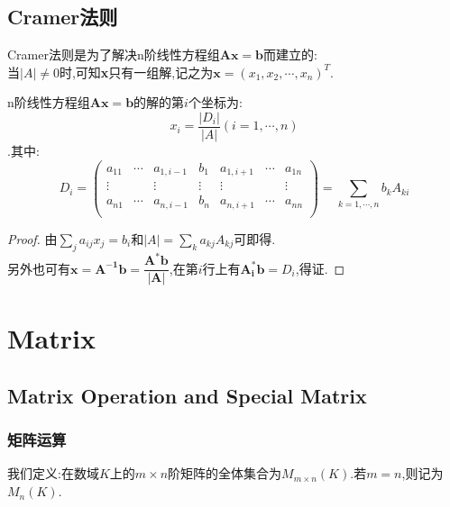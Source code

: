 \documentclass[UTF8,a4paper,notitlepage]{book}
\begin{document}
        \section{Cramer法则}
        Cramer法则是为了解决n阶线性方程组$\mathbf{Ax=b}$而建立的:\\ 
        当$|A|\neq 0$时,可知\textbf{x}只有一组解,记之为$\textbf{x}=(x_1,x_2,\cdots,x_n)^T$.
        \begin{theorem}[Cramer法则]
            n阶线性方程组$\mathbf{Ax=b}$的解的第$i$个坐标为:$$x_i=\dfrac{|D_i|}{|A|}(i=1,\cdots ,n)$$.其中:
            $$D_i=\begin{pmatrix}
                a_{11} & \cdots & a_{1,i-1} & b_1 & a_{1,i+1} & \cdots & a_{1n}\\ 
                \vdots & & \vdots & \vdots & \vdots & & \vdots \\ 
                a_{n1} & \cdots & a_{n,i-1} & b_n & a_{n,i+1} & \cdots & a_{nn}\\
            \end{pmatrix}=\sum_{k=1,\cdots ,n}b_kA_{ki}$$
        \end{theorem}
        \begin{proof}
            由$\sum_ja_{ij}x_{j}=b_i$和$|A|=\sum_k a_{kj}A_{kj}$可即得.\\ 
            另外也可有$\mathbf{x=A^{-1}b=\dfrac{A^* b}{|A|}}$,在第$i$行上有$\mathbf{A^*_i b}=D_i$,得证.
        \end{proof}
    \chapter{Matrix}
        \section{Matrix Operation and Special Matrix}%
        \subsection{矩阵运算}
        我们定义:在数域$K$上的$m\times n$阶矩阵的全体集合为$M_{m\times n}(K)$.若$m=n$,则记为$M_n(K)$.
\end{document}

